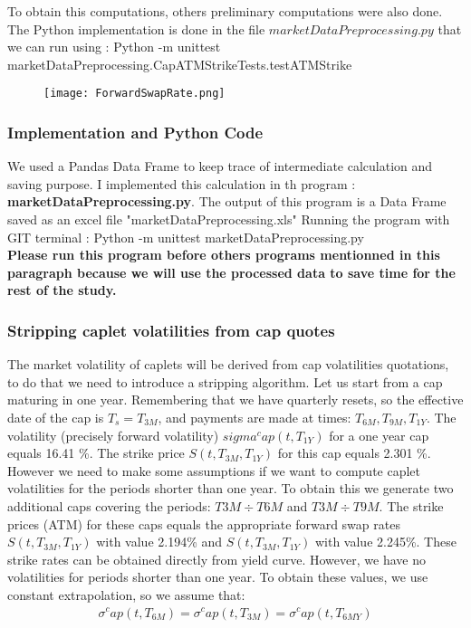 \documentclass[11pt]{article}
\numberwithin{equation}{subsection}
\begin{document}
To obtain this computations, others preliminary computations were also done. The Python implementation is done in the file \(marketDataPreprocessing.py\) that we can run using : Python -m unittest marketDataPreprocessing.CapATMStrikeTests.testATMStrike

\begin{figure}[H]
	\texttt{[image: ForwardSwapRate.png]}
\end{figure}


\subsubsection{Implementation and Python Code}
We used a Pandas Data Frame to keep trace of intermediate calculation and saving purpose. I implemented this calculation in th program : \textbf{marketDataPreprocessing.py}. The output of this program is a Data Frame saved as an excel file "marketDataPreprocessing.xls" 
Running the program with GIT terminal  : Python -m unittest marketDataPreprocessing.py\\
\textbf{Please run this program before others programs mentionned in this paragraph because we will use the processed data to save time for the rest of the study.}

\subsubsection{Stripping caplet volatilities from cap quotes}

The market volatility of caplets will be derived from cap volatilities quotations, to do that
we need to introduce a stripping algorithm.
Let us start from a cap maturing in one year. Remembering that we have quarterly resets,
so the effective date of the cap is \(T_s =T_{3M}\), and payments are made at times: \(T_{6M}, T_{9M}, T_{1Y}\).
The volatility (precisely forward volatility) \(sigma^cap(t, T_{1Y})\) for a one year cap equals 16.41 \%.
The strike price \(S(t, T_{3M}, T_{1Y})\) for this cap equals 2.301 \%. However we need to make
some assumptions if we want to compute caplet volatilities for the periods shorter than
one year. To obtain this we generate two additional caps covering the periods: \(T3M÷T6M\)
and \(T3M÷T9M\). The strike prices (ATM) for these caps equals the appropriate forward
swap rates \(S(t, T_{3M}, T_{1Y})\) with value 2.194\% and \(S(t, T_{3M}, T_{1Y})\) with value 2.245\%. These
strike rates can be obtained directly from yield curve. However, we have no volatilities for
periods shorter than one year. To obtain these values, we use constant extrapolation, so
we assume that: 
\begin{eqnarray*}
\sigma^cap(t, T_{6M}) = \sigma^cap(t, T_{3M}) = \sigma^cap(t, T_{6MY}) 
\end{eqnarray*}
\end{document}
